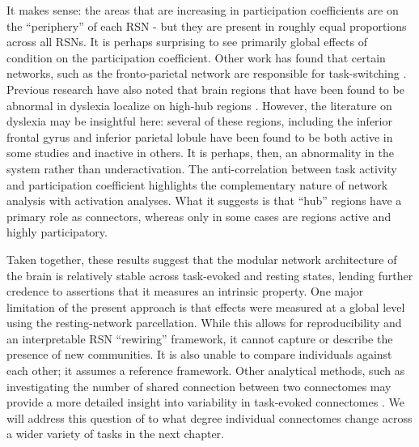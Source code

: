 It makes sense: the areas that are increasing in participation coefficients are on the ``periphery'' of each RSN - but they are present in roughly equal proportions across all RSNs.  
It is perhaps surprising to see primarily global effects of condition on the participation coefficient. Other work has found that certain networks, such as the fronto-parietal network are responsible for task-switching \citep{Cole2013}. Previous research have also noted that brain regions that have been found to be abnormal in dyslexia localize on high-hub regions \citep{Bailey2018}. However, the literature on dyslexia may be insightful here: several of these regions, including the inferior frontal gyrus and inferior parietal lobule have been found to be both active in some studies and inactive in others. It is perhaps, then, an abnormality in the system rather than underactivation. The anti-correlation between task activity and participation coefficient highlights the complementary nature of network analysis with activation analyses. What it suggests is that ``hub'' regions have a primary role as connectors, whereas only in some cases are regions active and highly participatory. 

Taken together, these results suggest that the modular network architecture of the brain is relatively stable across task-evoked and resting states, lending further credence to assertions that it measures an intrinsic property. One major limitation of the present approach is that effects were measured at a global level using the resting-network parcellation. While this allows for reproducibility and an interpretable RSN ``rewiring'' framework, it cannot capture or describe the presence of new communities. It is also unable to compare individuals against each other; it assumes a reference framework. Other analytical methods, such as investigating the number of shared connection between two connectomes may provide a more detailed insight into variability in task-evoked connectomes \citep{Petersen2016}. We will address this question of to what degree individual connectomes change across a wider variety of tasks in the next chapter.
